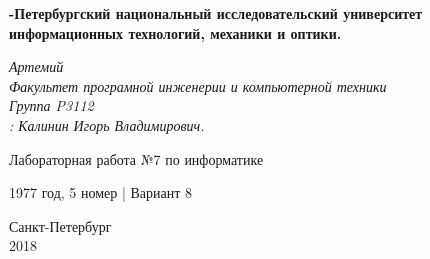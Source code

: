 \begin{center}
\thispagestyle{empty}
\textbf{-Петербургский национальный исследовательский университет информационных технологий, механики и оптики.}

\vspace{3cm}
\textit{ Артемий}
\\
\textit{Факультет програмной инженерии и компьютерной техники}\\
\textit{Группа P3112}\\
\textit{: Калинин Игорь Владимирович.}

\vspace{2cm}
\huge{ Лабораторная работа №7 по информатике}

\huge{1977 год, 5 номер   |   Вариант 8}
\vspace{14cm}

Санкт-Петербург \\
2018
\end{center}